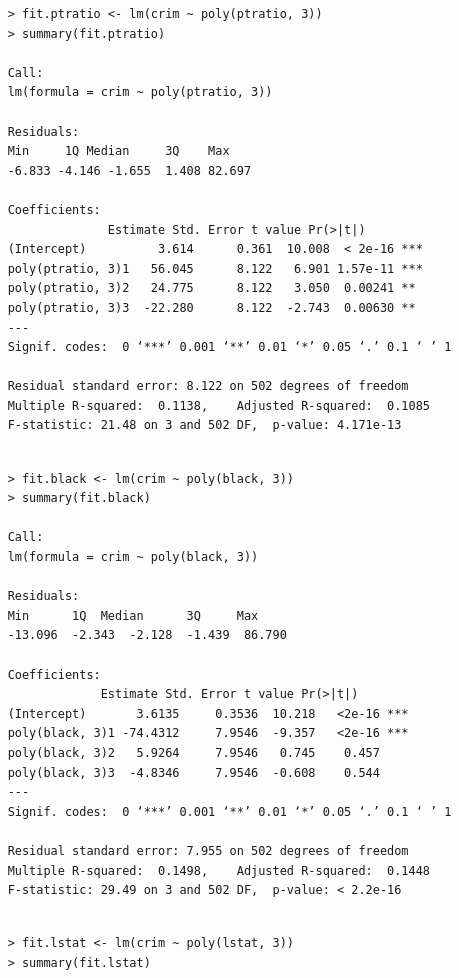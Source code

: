 \documentclass{article}
\begin{document}
\begin{itemize}
\begin{program}
	\begin{verbatim}
	> fit.ptratio <- lm(crim ~ poly(ptratio, 3))
	> summary(fit.ptratio)
	
	Call:
	lm(formula = crim ~ poly(ptratio, 3))
	
	Residuals:
	Min     1Q Median     3Q    Max 
	-6.833 -4.146 -1.655  1.408 82.697 
	
	Coefficients:
	              Estimate Std. Error t value Pr(>|t|)    
	(Intercept)          3.614      0.361  10.008  < 2e-16 ***
	poly(ptratio, 3)1   56.045      8.122   6.901 1.57e-11 ***
	poly(ptratio, 3)2   24.775      8.122   3.050  0.00241 ** 
	poly(ptratio, 3)3  -22.280      8.122  -2.743  0.00630 ** 
	---
	Signif. codes:  0 ‘***’ 0.001 ‘**’ 0.01 ‘*’ 0.05 ‘.’ 0.1 ‘ ’ 1
	
	Residual standard error: 8.122 on 502 degrees of freedom
	Multiple R-squared:  0.1138,	Adjusted R-squared:  0.1085 
	F-statistic: 21.48 on 3 and 502 DF,  p-value: 4.171e-13
	
	\end{verbatim}
\end{program}


\begin{program}
	\begin{verbatim}
	> fit.black <- lm(crim ~ poly(black, 3))
	> summary(fit.black)
	
	Call:
	lm(formula = crim ~ poly(black, 3))
	
	Residuals:
	Min      1Q  Median      3Q     Max 
	-13.096  -2.343  -2.128  -1.439  86.790 
	
	Coefficients:
	             Estimate Std. Error t value Pr(>|t|)    
	(Intercept)       3.6135     0.3536  10.218   <2e-16 ***
	poly(black, 3)1 -74.4312     7.9546  -9.357   <2e-16 ***
	poly(black, 3)2   5.9264     7.9546   0.745    0.457    
	poly(black, 3)3  -4.8346     7.9546  -0.608    0.544    
	---
	Signif. codes:  0 ‘***’ 0.001 ‘**’ 0.01 ‘*’ 0.05 ‘.’ 0.1 ‘ ’ 1
	
	Residual standard error: 7.955 on 502 degrees of freedom
	Multiple R-squared:  0.1498,	Adjusted R-squared:  0.1448 
	F-statistic: 29.49 on 3 and 502 DF,  p-value: < 2.2e-16
	
	\end{verbatim}
\end{program}


\begin{program}
	\begin{verbatim}
	> fit.lstat <- lm(crim ~ poly(lstat, 3))
	> summary(fit.lstat)
	

\end{verbatim}
\end{program}
\end{itemize}
\end{document}
